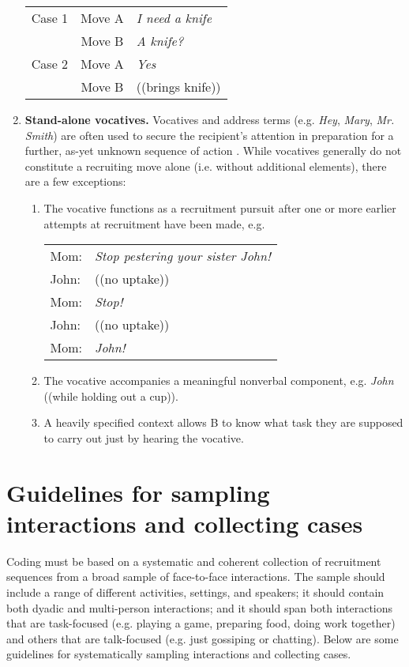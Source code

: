 \documentclass[output=paper]{langsci/langscibook}
\begin{document}
\begin{enumerate}
\begin{tabular}{l c l}
Case 1 &  Move A & \textit{I need a knife} \\
                &  Move B & \textit{A knife?} \\
Case 2 &  Move A & \textit{Yes} \\
                &  Move B & ((brings knife)) \\
\end{tabular}

\item \textbf{Stand-alone vocatives.} Vocatives and address terms (e.g. \textit{Hey}, \textit{Mary}, \textit{Mr. Smith}) are often used to secure the recipient’s attention in preparation for a further, as-yet unknown sequence of action \citep[chap. 4]{Schegloff2007}. While vocatives generally do not constitute a recruiting move alone (i.e. without additional elements), there are a few exceptions:
\renewcommand{\theenumii}{\roman{enumii}}
\begin{enumerate}
  \item   The vocative functions as a recruitment pursuit after one or more earlier attempts at recruitment have been made, e.g.

\begin{tabular}{l l }
Mom:  &  \textit{Stop pestering your sister John!} \\
John: &  ((no uptake)) \\
Mom: &   \textit{Stop!} \\
John: & ((no uptake)) \\
Mom: & \textit{John!} \\
\end{tabular}

  \item   The vocative accompanies a meaningful nonverbal component, e.g. \textit{John} ((while holding out a cup)).
  \item   A heavily specified context allows B to know what task they are supposed to carry out just by hearing the vocative.
\end{enumerate}
\end{enumerate}

\section{Guidelines for sampling interactions and collecting cases}\label{sec:coding:4}

Coding must be based on a systematic and coherent collection of recruitment sequences from a broad sample of face-to-face interactions. The sample should include a range of different activities, settings, and speakers; it should contain both dyadic and multi-person interactions; and it should span both interactions that are task-focused (e.g. playing a game, preparing food, doing work together) and others that are talk-focused (e.g. just gossiping or chatting). Below are some guidelines for systematically sampling interactions and collecting cases.
\end{document}
